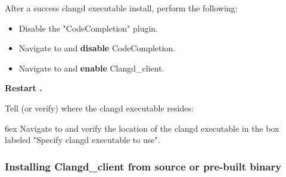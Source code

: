 After a success clangd executable install, perform the following:

\begin{itemize}[noitemsep]
\item Disable the "CodeCompletion" plugin.
\item Navigate to  and \textbf{disable} CodeCompletion.
\item Navigate to  and \textbf{enable} Clangd\_client.
\end{itemize}
\textbf{Restart \codeblocks.}

Tell (or verify) \codeblocks where the clangd executable resides:\par
\begingroup
\leftskip 6ex
Navigate to  and verify the location of the clangd executable in the box labeled "Specify clangd executable to use".
\par
\endgroup

\subsubsection{Installing Clangd\_client from source or pre-built binary}

